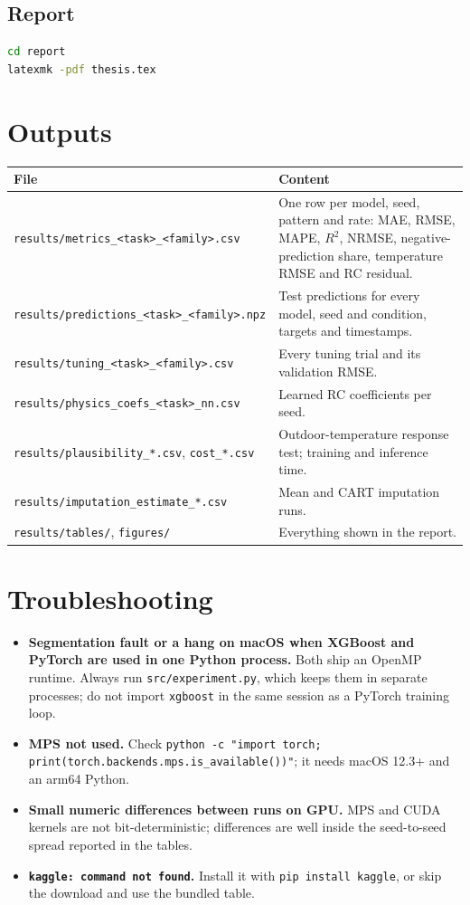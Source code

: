 \documentclass[11pt,a4paper]{article}
\begin{document}
\subsection{Report}
\begin{lstlisting}[language=bash]
cd report
latexmk -pdf thesis.tex
\end{lstlisting}

\section{Outputs}
\begin{table}[H]
\centering\small
\begin{tabular}{p{6.4cm}p{8.2cm}}
\toprule
File & Content \\
\midrule
\nolinkurl{results/metrics_<task>_<family>.csv} & One row per model, seed, pattern and rate: MAE, RMSE, MAPE, $R^2$, NRMSE, negative-prediction share, temperature RMSE and RC residual. \\
\nolinkurl{results/predictions_<task>_<family>.npz} & Test predictions for every model, seed and condition, targets and timestamps. \\
\nolinkurl{results/tuning_<task>_<family>.csv} & Every tuning trial and its validation RMSE. \\
\nolinkurl{results/physics_coefs_<task>_nn.csv} & Learned RC coefficients per seed. \\
\nolinkurl{results/plausibility_*.csv}, \nolinkurl{cost_*.csv} & Outdoor-temperature response test; training and inference time. \\
\nolinkurl{results/imputation_estimate_*.csv} & Mean and CART imputation runs. \\
\nolinkurl{results/tables/}, \nolinkurl{figures/} & Everything shown in the report. \\
\bottomrule
\end{tabular}
\end{table}

\section{Troubleshooting}
\begin{itemize}[nosep]
\item \textbf{Segmentation fault or a hang on macOS when XGBoost and PyTorch are used in one Python process.} Both ship an OpenMP runtime. Always run \nolinkurl{src/experiment.py}, which keeps them in separate processes; do not import \texttt{xgboost} in the same session as a PyTorch training loop.
\item \textbf{MPS not used.} Check \texttt{python -c "import torch; print(torch.backends.mps.is\_available())"}; it needs macOS 12.3+ and an arm64 Python.
\item \textbf{Small numeric differences between runs on GPU.} MPS and CUDA kernels are not bit-deterministic; differences are well inside the seed-to-seed spread reported in the tables.
\item \textbf{\texttt{kaggle: command not found}.} Install it with \texttt{pip install kaggle}, or skip the download and use the bundled table.
\end{itemize}
\end{document}
